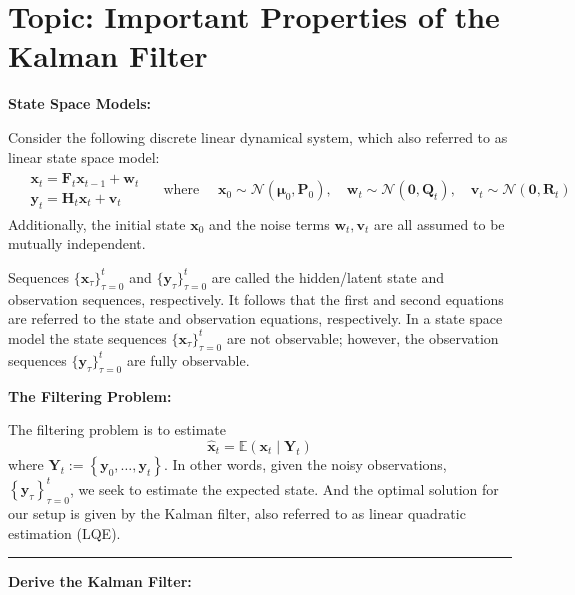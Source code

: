 \documentclass[11pt]{article}
\theoremstyle{plain} %
\newenvironment{topic}
  {\color{C2}\normalfont\begin{framed}\begingroup}
    {\endgroup\end{framed}}
\theoremstyle{remark}
\begin{document}
\section{Topic: Important Properties of the Kalman Filter}
\begin{topic}
  \textbf{State Space Models:}

  Consider the following discrete linear dynamical system, which also referred to as linear state space model:
  \begin{align}
    \begin{aligned}
       & \mathbf{x}_{t}=\mathbf{F}_{t} \mathbf{x}_{t-1}+\mathbf{w}_{t} \\
       & \mathbf{y}_{t}=\mathbf{H}_{t} \mathbf{x}_{t}+\mathbf{v}_{t}
    \end{aligned}\quad \text{ where } \quad
    \mathbf{x}_{0} \sim \mathcal{N}\left(\boldsymbol{\mu}_{0}, \mathbf{P}_{0}\right),\quad
    \mathbf{w}_{t} \sim \mathcal{N}\left(\mathbf{0}, \mathbf{Q}_{t}\right), \quad
    \mathbf{v}_{t} \sim \mathcal{N}\left(\mathbf{0}, \mathbf{R}_{t}\right)
    \label{eq: state space model relation}
  \end{align}
  Additionally, the initial state $\mathbf{x}_{0}$ and the noise terms $\mathbf{w}_{t},
    \mathbf{v}_{t}$ are all assumed to be mutually independent.

  Sequences $\{\mathbf{x}_{\tau}\}_{\tau=0}^t$ and $\{\mathbf{y}_{\tau}\}_{\tau=0}^t$ are
  called the hidden/latent state and observation sequences, respectively.
  It follows that the first and second equations are referred to the state and observation
  equations, respectively.
  In a state space model the state sequences $\{\mathbf{x}_{\tau}\}_{\tau=0}^t$ are not observable;
  however, the observation sequences $\{\mathbf{y}_{\tau}\}_{\tau=0}^t$ are fully observable.


  \textbf{The Filtering Problem:}

  The filtering problem is to estimate
  $$
    \hat{\mathbf{x}}_{t}=\mathbb{E}\left(\mathbf{x}_{t} \mid \mathbf{Y}_{t}\right)
  $$
  where $\mathbf{Y}_{t}:=\left\{\mathbf{y}_{0}, \ldots, \mathbf{y}_{t}\right\}$.
  In other words, given the noisy observations,
  $\left\{\mathbf{y}_{\tau}\right\}_{\tau=0}^{t}$, we seek to estimate the
  expected state. And the optimal solution for our setup is given by the Kalman filter, also referred
  to as linear quadratic estimation (LQE).
  \vspace{0.8em}

  \hrule

  \textbf{Derive the Kalman Filter:}


\end{topic}
\end{document}
